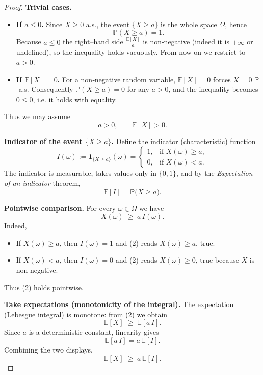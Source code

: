 \begin{proof}
\textbf{Trivial cases.}
\begin{itemize}
\item \textbf{If $a\le 0$.}  
Since $X\ge 0$ a.s., the event $\{X\ge a\}$ is the whole space $\Omega$, hence
\[
\mathbb{P}(X\ge a)=1.
\]
Because $a\le 0$ the right–hand side $\frac{\mathbb{E}[X]}{a}$ is non‑negative (indeed it is $+\infty$ or undefined), so the inequality holds vacuously. From now on we restrict to $a>0$.

\item \textbf{If $\mathbb{E}[X]=0$.}  
For a non‑negative random variable, $\mathbb{E}[X]=0$ forces $X=0$ $\mathbb{P}$‑a.s. Consequently $\mathbb{P}(X\ge a)=0$ for any $a>0$, and the inequality becomes $0\le 0$, i.e. it holds with equality.
\end{itemize}
Thus we may assume
\[
a>0,\qquad \mathbb{E}[X]>0 .
\]

\medskip
\textbf{Indicator of the event $\{X\ge a\}$.}
Define the indicator (characteristic) function
\[
I(\omega):=\mathbf 1_{\{X\ge a\}}(\omega)=
\begin{cases}
1, & \text{if } X(\omega)\ge a,\\[4pt]
0, & \text{if } X(\omega)< a .
\end{cases}
\]
The indicator is measurable, takes values only in $\{0,1\}$, and by the
\emph{Expectation of an indicator} theorem,
\begin{equation}
\mathbb{E}[I]=\mathbb{P}\bigl(X\ge a\bigr). \tag{1}
\end{equation}

\medskip
\textbf{Pointwise comparison.}
For every $\omega\in\Omega$ we have
\begin{equation}
X(\omega)\;\ge\;a\,I(\omega). \tag{2}
\end{equation}
Indeed,
\begin{itemize}
\item If $X(\omega)\ge a$, then $I(\omega)=1$ and (2) reads $X(\omega)\ge a$, true.
\item If $X(\omega)<a$, then $I(\omega)=0$ and (2) reads $X(\omega)\ge 0$, true because $X$ is non‑negative.
\end{itemize}
Thus (2) holds pointwise.

\medskip
\textbf{Take expectations (monotonicity of the integral).}
The expectation (Lebesgue integral) is monotone: from (2) we obtain
\[
\mathbb{E}[X]\;\ge\;\mathbb{E}[a\,I].
\]
Since $a$ is a deterministic constant, linearity gives
\begin{equation}
\mathbb{E}[a\,I]=a\,\mathbb{E}[I]. \tag{3}
\end{equation}
Combining the two displays,
\begin{equation}
\mathbb{E}[X]\;\ge\;a\,\mathbb{E}[I]. \tag{4}
\end{equation}


\end{proof}
